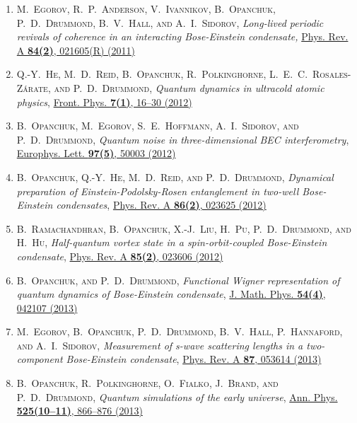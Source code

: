 
\begin{enumerate}
\item \textsc{M.~Egorov, R.~P.~Anderson, V.~Ivannikov, B.~Opanchuk, P.~D.~Drummond, B.~V.~Hall, \textnormal{and} A.~I.~Sidorov}, \textit{Long-lived periodic revivals of coherence in an interacting Bose-Einstein condensate,} \href{http://dx.doi.org/doi:10.1103/PhysRevA.84.021605}{Phys. Rev. A \textbf{84(2)}, 021605(R) (2011)}

\item \textsc{Q.-Y.~He, M.~D.~Reid, B.~Opanchuk, R.~Polkinghorne, L.~E.~C.~Rosales-Z\'arate, \textnormal{and} P.~D.~Drummond}, \textit{Quantum dynamics in ultracold atomic physics}, \href{http://dx.doi.org/doi:10.1007/s11467-011-0232-x}{Front. Phys. \textbf{7(1)}, 16--30 (2012)}

\item \textsc{B.~Opanchuk, M.~Egorov, S.~E.~Hoffmann, A.~I.~Sidorov, \textnormal{and} P.~D.~Drummond}, \textit{Quantum noise in three-dimensional BEC interferometry}, \href{http://dx.doi.org/doi:10.1209/0295-5075/97/50003}{Europhys. Lett. \textbf{97(5)}, 50003 (2012)}

\item \textsc{B.~Opanchuk, Q.-Y.~He, M.~D.~Reid, \textnormal{and} P.~D.~Drummond}, \textit{Dynamical preparation of Einstein-Podolsky-Rosen entanglement in two-well Bose-Einstein condensates}, \href{http://dx.doi.org/doi:10.1103/PhysRevA.86.023625}{Phys. Rev. A \textbf{86(2)}, 023625 (2012)}

\item \textsc{B.~Ramachandhran, B.~Opanchuk, X.-J.~Liu, H.~Pu, P.~D.~Drummond, \textnormal{and} H.~Hu}, \textit{Half-quantum vortex state in a spin-orbit-coupled Bose-Einstein condensate}, \href{http://dx.doi.org/doi:10.1103/PhysRevA.85.023606}{Phys. Rev. A \textbf{85(2)}, 023606 (2012)}

\item \textsc{B.~Opanchuk, \textnormal{and} P.~D.~Drummond}, \textit{Functional Wigner representation of quantum dynamics of Bose-Einstein condensate}, \href{http://dx.doi.org/doi:10.1063/1.4801781}{J. Math. Phys. \textbf{54(4)}, 042107 (2013)}

\item \textsc{M.~Egorov, B.~Opanchuk, P.~D.~Drummond, B.~V.~Hall, P.~Hannaford, \textnormal{and} A.~I.~Sidorov}, \textit{Measurement of s-wave scattering lengths in a two-component Bose-Einstein condensate}, \href{http://dx.doi.org/doi:10.1103/PhysRevA.87.053614}{Phys. Rev. A \textbf{87}, 053614 (2013)}

\item \textsc{B.~Opanchuk, R.~Polkinghorne, O.~Fialko, J.~Brand, \textnormal{and} P.~D.~Drummond}, \textit{Quantum simulations of the early universe}, \href{http://dx.doi.org/doi:10.1002/andp.201300113}{Ann. Phys. \textbf{525(10--11)}, 866--876 (2013)}
\end{enumerate}

